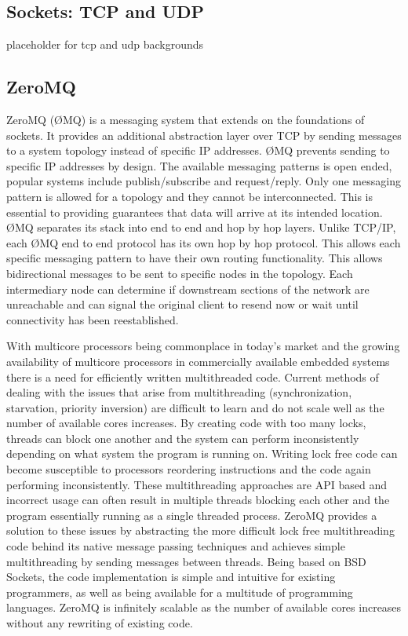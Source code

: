 \subsection{Sockets: TCP and UDP}

placeholder for tcp and udp backgrounds

\subsection{ZeroMQ}

ZeroMQ (ØMQ) is a messaging system that extends on the foundations of sockets. It provides an additional abstraction layer over TCP by sending messages to a system topology instead of specific IP addresses. ØMQ prevents sending to specific IP addresses by design. The available messaging patterns is open ended, popular systems include publish/subscribe and request/reply. Only one messaging pattern is allowed for a topology and they cannot be interconnected. This is essential to providing guarantees that data will arrive at its intended location. ØMQ separates its stack into end to end and hop by hop layers. Unlike TCP/IP, each ØMQ end to end protocol has its own hop by hop protocol\cite{ZMQTHEORY}. This allows each specific messaging pattern to have their own routing functionality. This allows bidirectional messages to be sent to specific nodes in the topology. Each intermediary node can determine if downstream sections of the network are unreachable and can signal the original client to resend now or wait until connectivity has been reestablished. 

With multicore processors being commonplace in today’s market and the growing availability of multicore processors in commercially available embedded systems there is a need for efficiently written multithreaded code. Current methods of dealing with the issues that arise from multithreading (synchronization, starvation, priority inversion) are difficult to learn and do not scale well as the number of available cores increases. By creating code with too many locks, threads can block one another and the system can perform inconsistently depending on what system the program is running on. Writing lock free code can become susceptible to processors reordering instructions and the code again performing inconsistently. These multithreading approaches are API based and incorrect usage can often result in multiple threads blocking each other and the program essentially running as a single threaded process. 
ZeroMQ provides a solution to these issues by abstracting the more difficult lock free multithreading code behind its native message passing techniques and achieves simple multithreading by sending messages between threads. Being based on BSD Sockets, the code implementation is simple and intuitive for existing programmers, as well as being available for a multitude of programming languages. ZeroMQ is infinitely scalable as the number of available cores increases without any rewriting of existing code.



